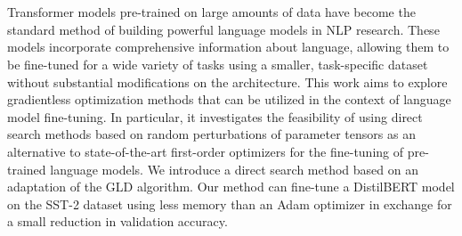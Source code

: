 \chapter{\abstractname}

Transformer models pre-trained on large amounts of data 
have become the standard method of building powerful
language models in \ac{NLP} research. These models 
incorporate comprehensive information about language, 
allowing them to be fine-tuned for a wide variety 
of tasks using a smaller, task-specific dataset
without substantial modifications on the architecture. 
This work aims to explore gradientless optimization 
methods that can be utilized in the context of language 
model fine-tuning. In particular, it investigates
the feasibility 
of using direct search methods 
based on random perturbations of parameter tensors 
as an alternative 
to state-of-the-art first-order optimizers for the 
fine-tuning of pre-trained language models. 
We introduce a direct search 
method based on an adaptation of the \ac{GLD} algorithm. 
Our method can 
fine-tune a DistilBERT model on the SST-2 dataset 
using less memory than an Adam optimizer in exchange 
for a small reduction in validation accuracy.
